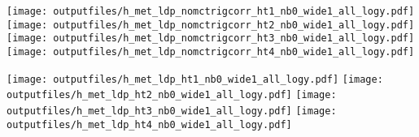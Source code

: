 \documentclass[11pt]{article}
\begin{document}
    \noindent
     \texttt{[image: outputfiles/h\_met\_ldp\_nomctrigcorr\_ht1\_nb0\_wide1\_all\_logy.pdf]}
     \texttt{[image: outputfiles/h\_met\_ldp\_nomctrigcorr\_ht2\_nb0\_wide1\_all\_logy.pdf]}
     \texttt{[image: outputfiles/h\_met\_ldp\_nomctrigcorr\_ht3\_nb0\_wide1\_all\_logy.pdf]}
     \texttt{[image: outputfiles/h\_met\_ldp\_nomctrigcorr\_ht4\_nb0\_wide1\_all\_logy.pdf]}

    \noindent
     \texttt{[image: outputfiles/h\_met\_ldp\_ht1\_nb0\_wide1\_all\_logy.pdf]}
     \texttt{[image: outputfiles/h\_met\_ldp\_ht2\_nb0\_wide1\_all\_logy.pdf]}
     \texttt{[image: outputfiles/h\_met\_ldp\_ht3\_nb0\_wide1\_all\_logy.pdf]}
     \texttt{[image: outputfiles/h\_met\_ldp\_ht4\_nb0\_wide1\_all\_logy.pdf]}

    \clearpage







\end{document}
